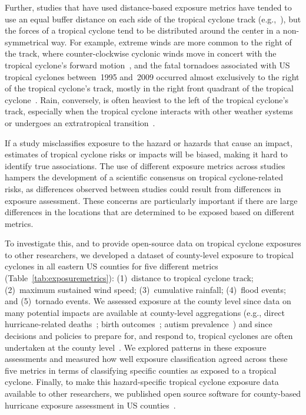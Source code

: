 Further, studies that have used distance-based exposure metrics have tended to
use an equal buffer distance on each side of the tropical cyclone track
(e.g.,~\cite{czajkowski2011, grabich2015, grabich2016, zandbergen2009,
tansel2010}), but the forces of a tropical cyclone tend to be distributed
around the center in a non-symmetrical way. For example, extreme winds are more
common to the right of the track, where counter-clockwise cyclonic winds move
in concert with the tropical cyclone's forward
motion~\parencite{halverson2015}, and the fatal tornadoes associated with
\ac{US} tropical cyclones between~1995 and~2009 occurred almost exclusively to
the right of the tropical cyclone's track, mostly in the right front quadrant
of the tropical cyclone~\parencite{moore2012}. Rain, conversely, is often
heaviest to the left of the tropical cyclone's track, especially when the
tropical cyclone interacts with other weather systems~\parencite{atallah2003,
atallah2007, zhu2013variations} or undergoes an extratropical
transition~\parencite{elsberry2002}.

If a study misclassifies exposure to the hazard or hazards that cause an
impact, estimates of tropical cyclone risks or impacts will be biased, making
it hard to identify true associations. The use of different exposure metrics
across studies hampers the development of a scientific consensus on tropical
cyclone-related risks, as differences observed between studies could result
from differences in exposure assessment.  These concerns are particularly
important if there are large differences in the locations that are determined
to be exposed based on different metrics.  

To investigate this, and to provide open-source data on tropical cyclone exposures
to other researchers, we developed a dataset of county-level exposure to
tropical cyclones in all eastern \ac{US} counties for five different metrics
(Table~\ref{tab:exposuremetrics}): (1)~distance to tropical cyclone track;
(2)~maximum sustained wind speed; (3)~cumulative rainfall; (4)~flood events;
and (5)~tornado events.  We assessed exposure at the county level since data on
many potential impacts are available at county-level aggregations (e.g., direct
hurricane-related deaths~\parencite{czajkowski2011}; birth
outcomes~\parencite{grabich2015, grabich2016}; autism
prevalence~\parencite{kinney2008}) and since decisions and policies to prepare
for, and respond to, tropical cyclones are often undertaken at the county
level~\parencite{zandbergen2009, rappaport2000}.  We explored patterns in these
exposure assessments and measured how well exposure classification agreed
across these five metrics in terms of classifying specific counties as exposed
to a tropical cyclone.  Finally, to make this hazard-specific tropical cyclone
exposure data available to other researchers, we published open source software
for county-based hurricane exposure assessment in \ac{US}
counties~\parencite{hurricaneexposure}.

